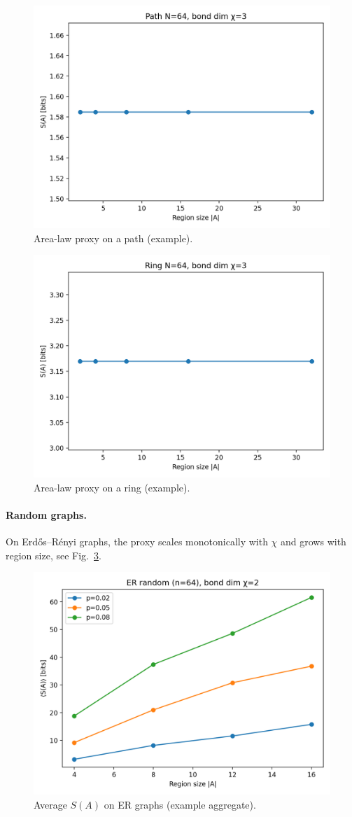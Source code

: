 \documentclass[11pt]{article}
\begin{document}
\begin{figure}[h]
  \centering
  \includegraphics[width=.7\textwidth]{../outputs/figs/entropy_path_N64_chi3.png}
  \caption{Area-law proxy on a path (example).}
  \label{fig:path}
\end{figure}

\begin{figure}[h]
  \centering
  \includegraphics[width=.7\textwidth]{../outputs/figs/entropy_ring_N64_chi3.png}
  \caption{Area-law proxy on a ring (example).}
  \label{fig:ring}
\end{figure}

\paragraph{Random graphs.} On Erdős–Rényi graphs, the proxy scales monotonically with $\chi$ and grows with region size, see Fig.~\ref{fig:er}.

\begin{figure}[h]
  \centering
  \includegraphics[width=.7\textwidth]{../outputs/figs/entropy_er_random_n64_chi2.png}
  \caption{Average $S(A)$ on ER graphs (example aggregate).}
  \label{fig:er}
\end{figure}
\end{document}
